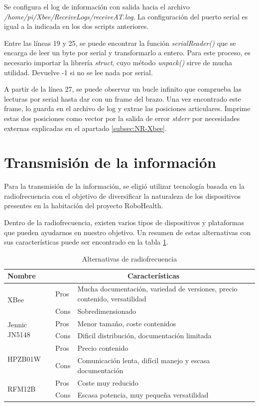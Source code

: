 Se configura el log de información con salida hacia el archivo \textit{/home/pi/Xbee/ReceiveLogs/receiveAT.log}. La configuración del puerto serial es igual a la indicada en los dos scripts anteriores.

Entre las líneas 19 y 25, se puede encontrar la función \textit{serialReader()} que se encarga de leer un byte por serial y transformarlo a entero. Para este proceso, es necesario importar la librería \textit{struct}, cuyo método \textit{unpack()} sirve de mucha utilidad. Devuelve -1 si no se lee nada por serial.

A partir de la línea 27, se puede observar un bucle infinito que comprueba las lecturas por serial hasta dar con un frame del brazo. Una vez encontrado este frame, lo guarda en el archivo de log y extrae las posiciones articulares. Imprime estas dos posiciones como vector por la salida de error \textit{stderr} por necesidades externas explicadas en el apartado \ref{subsec:NR-Xbee}.

\section{Transmisión de la información}

Para la transmisión de la información, se eligió utilizar tecnología basada en la radiofrecuencia con el objetivo de diversificar la naturaleza de los dispositivos presentes en la habitación del proyecto RoboHealth.

Dentro de la radiofrecuencia, existen varios tipos de dispositivos y plataformas que pueden ayudarnos en nuestro objetivo. Un resumen de estas alternativas con sus características puede ser encontrado en la tabla \ref{tab:radio}.

\begin{table}[H]
\begin{center}
\begin{tabular}{|m{3cm}|m{1cm}|m{7cm}|}
\hline
\textbf{Nombre} & \multicolumn{2}{|c|}{\textbf{Características}}\\
\hline
\hline
\multirow{2}{3cm}{XBee} & Pros & Mucha documentación, variedad de versiones, precio contenido, versatilidad\\
\cline{2-3}
& Cons & Sobredimensionado\\
\hline
\multirow{2}{3cm}{Jennic JN5148} & Pros & Menor tamaño, coste contenidos\\
\cline{2-3}
& Cons & Dificil distribución, documentación limitada\\
\hline
\multirow{2}{3cm}{HPZB01W} & Pros & Precio contenido\\
\cline{2-3}
& Cons & Comunicación lenta, difícil manejo y escasa documentación\\
\hline
\multirow{2}{3cm}{RFM12B} & Pros & Coste muy reducido\\
\cline{2-3}
& Cons & Escasa potencia, muy pequeña versatilidad\\
\hline
\end{tabular}
\end{center}
\caption{Alternativas de radiofrecuencia}
\label{tab:radio}
\end{table}

